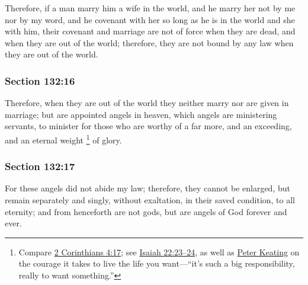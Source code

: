 		Therefore, if a man marry him a wife in the world, and he marry her not by me nor by my word, and he covenant with her so long as he is in the world and she with him, their covenant and marriage are not of force when they are dead, and when they are out of the world; therefore, they are not bound by any law when they are out of the world.


	\subsubsection{Section 132:16} %
		\label{DC132-16}

		Therefore, when they are out of the world they neither marry nor are given in marriage; but are appointed angels in heaven, which angels are ministering servants, to minister for those who are worthy of a far more, and an exceeding, and an eternal weight%
			\footnote{%
				\label{DC132-16-NOTE-weight}%
				Compare \hyperref[2CORINTHIANS-4-17]{2 Corinthians 4:17}; see \hyperref[ISAIAH-22-23]{Isaiah 22:23--24}, as well as \hyperref[TTW-LIFE-DREAMS-001]{Peter Keating} on the courage it takes to live the life you want---``it's such a big responsibility, really to want something.''
				}
		of glory.


	\subsubsection{Section 132:17} %
		\label{DC132-17}

		For these angels did not abide my law; therefore, they cannot be enlarged, but remain separately and singly, without exaltation, in their saved condition, to all eternity; and from henceforth are not gods, but are angels of God forever and ever.

